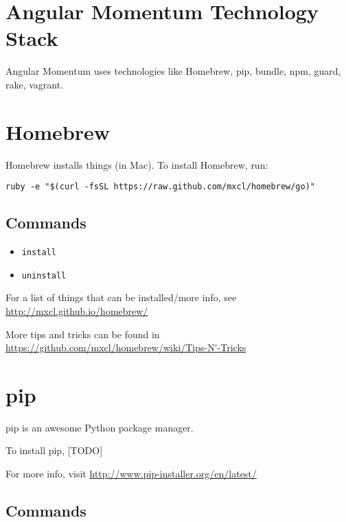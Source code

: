 \documentclass[12pt]{article}
\begin{document}
\newpage
\section{Angular Momentum Technology Stack}

Angular Momentum uses technologies like Homebrew, pip, bundle, npm, guard, rake, vagrant.

\section{Homebrew}
Homebrew installs things (in Mac). To install Homebrew, run:

\texttt{ruby -e "\$(curl -fsSL https://raw.github.com/mxcl/homebrew/go)"}

\subsection{Commands}

\begin{itemize}

\item{\texttt{install}}

\item{\texttt{uninstall}}

\end{itemize}

For a list of things that can be installed/more info, see \url{http://mxcl.github.io/homebrew/}

More tips and tricks can be found in \url{https://github.com/mxcl/homebrew/wiki/Tips-N'-Tricks}

\section{pip}
pip is an awesome Python package manager.

To install pip, [TODO]

For more info, visit \url{http://www.pip-installer.org/en/latest/}

\subsection{Commands}
\end{document}
